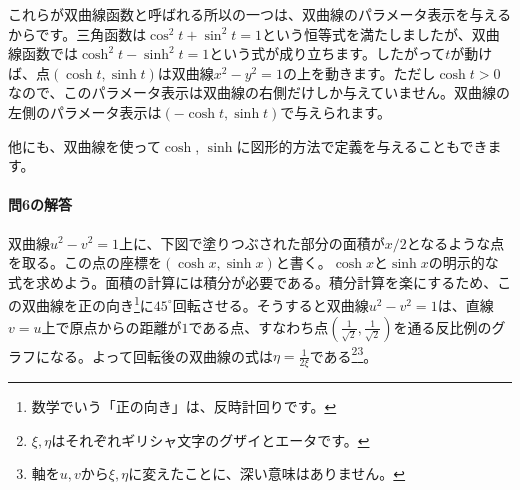 これらが双曲線函数と呼ばれる所以の一つは、双曲線のパラメータ表示を与えるからです。三角函数は$\cos^2 t + \sin^2 t =1$という恒等式を満たしましたが、双曲線函数では$\cosh^2 t - \sinh^2 t = 1$という式が成り立ちます。したがって$t$が動けば、点$(\cosh t,\sinh t)$は双曲線$x^2-y^2=1$の上を動きます。ただし$\cosh t>0$なので、このパラメータ表示は双曲線の右側だけしか与えていません。双曲線の左側のパラメータ表示は$(-\cosh t,\sinh t)$で与えられます。

他にも、双曲線を使って$\cosh$, $\sinh$に図形的方法で定義を与えることもできます。

\paragraph{問6の解答}
双曲線$u^2-v^2=1$上に、下図で塗りつぶされた部分の面積が$x/2$となるような点を取る。この点の座標を$(\cosh x, \sinh x)$と書く。$\cosh x$と$\sinh x$の明示的な式を求めよう。面積の計算には積分が必要である。積分計算を楽にするため、この双曲線を正の向き\footnote{数学でいう「正の向き」は、反時計回りです。}に$45^{\circ}$回転させる。そうすると双曲線$u^2-v^2=1$は、直線$v=u$上で原点からの距離が$1$である点、すなわち点$(\frac{1}{\sqrt{2}},\frac{1}{\sqrt{2}})$を通る反比例のグラフになる。よって回転後の双曲線の式は$\eta=\frac{1}{2\xi}$である\footnote{$\xi,\eta$はそれぞれギリシャ文字のグザイとエータです。}\footnote{軸を$u,v$から$\xi,\eta$に変えたことに、深い意味はありません。}。

